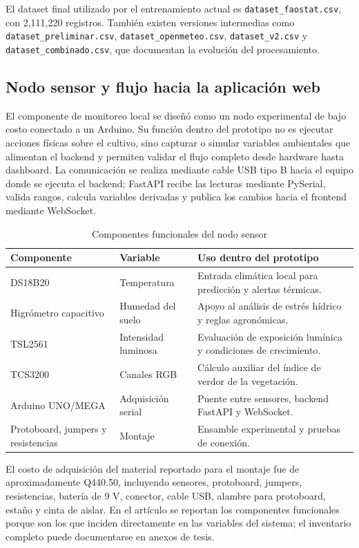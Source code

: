 \documentclass[conference,a4paper]{IEEEtran}
\begin{document}
El dataset final utilizado por el entrenamiento actual es \texttt{dataset\_faostat.csv}, con 2,111,220 registros. También existen versiones intermedias como \texttt{dataset\_preliminar.csv}, \texttt{dataset\_openmeteo.csv}, \texttt{dataset\_v2.csv} y \texttt{dataset\_combinado.csv}, que documentan la evolución del procesamiento.

\subsection{Nodo sensor y flujo hacia la aplicación web}
El componente de monitoreo local se diseñó como un nodo experimental de bajo costo conectado a un Arduino. Su función dentro del prototipo no es ejecutar acciones físicas sobre el cultivo, sino capturar o simular variables ambientales que alimentan el backend y permiten validar el flujo completo desde hardware hasta dashboard. La comunicación se realiza mediante cable USB tipo B hacia el equipo donde se ejecuta el backend; FastAPI recibe las lecturas mediante PySerial, valida rangos, calcula variables derivadas y publica los cambios hacia el frontend mediante WebSocket.

\begin{table}[!t]
\caption{Componentes funcionales del nodo sensor}
\centering
\scriptsize
\begin{tabularx}{\linewidth}{p{2.4cm}p{2.2cm}X}
\toprule
\textbf{Componente} & \textbf{Variable} & \textbf{Uso dentro del prototipo} \\
\midrule
DS18B20 & Temperatura & Entrada climática local para predicción y alertas térmicas. \\
Higrómetro capacitivo & Humedad del suelo & Apoyo al análisis de estrés hídrico y reglas agronómicas. \\
TSL2561 & Intensidad luminosa & Evaluación de exposición lumínica y condiciones de crecimiento. \\
TCS3200 & Canales RGB & Cálculo auxiliar del índice de verdor de la vegetación. \\
Arduino UNO/MEGA & Adquisición serial & Puente entre sensores, backend FastAPI y WebSocket. \\
Protoboard, jumpers y resistencias & Montaje & Ensamble experimental y pruebas de conexión. \\
\bottomrule
\end{tabularx}
\end{table}

El costo de adquisición del material reportado para el montaje fue de aproximadamente Q440.50, incluyendo sensores, protoboard, jumpers, resistencias, batería de 9 V, conector, cable USB, alambre para protoboard, estaño y cinta de aislar. En el artículo se reportan los componentes funcionales porque son los que inciden directamente en las variables del sistema; el inventario completo puede documentarse en anexos de tesis.
\end{document}
